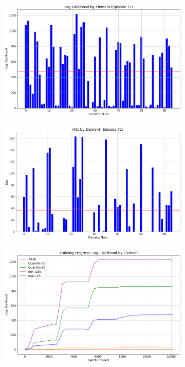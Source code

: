 \begin{figure}[h]
\begin{subfigure}[t]{\subfigwidth\textwidth}
\centering
\includegraphics[width=\linewidth]{../figs/search_known/perturbed_small/log_like.png}
\end{subfigure}
\hfill
\begin{subfigure}[t]{\subfigwidth\textwidth}
\centering
\includegraphics[width=\linewidth]{../figs/search_known/perturbed_small/hits.png}
\end{subfigure}
\medskip
\begin{subfigure}[t]{\subfigwidth\textwidth}
\centering
\includegraphics[width=\linewidth]{../figs/search_known/perturbed_small/learning_curve_log_like.png}

\end{subfigure}
\end{figure}
